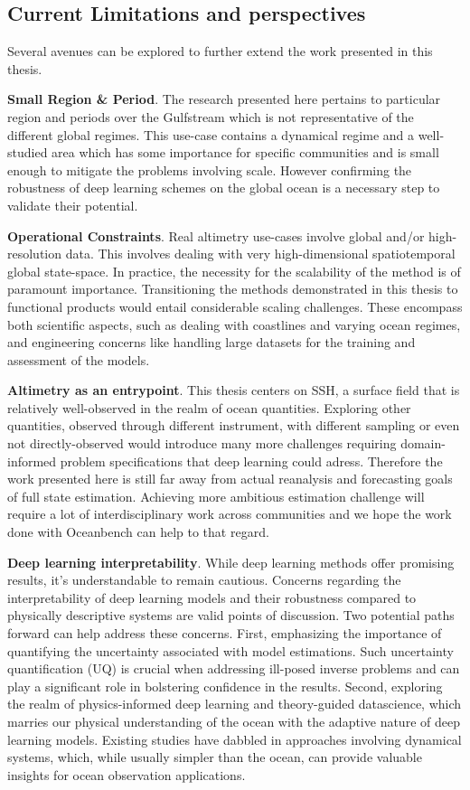 \begin{bibunit}
\newpage
\subsection{Current Limitations and perspectives}

Several avenues can be explored to further extend the work presented in this thesis.

\textbf{Small Region \& Period}.
The research presented here pertains to particular region and periods over the Gulfstream which is not representative of the different global regimes. 
This use-case contains a dynamical regime and a well-studied area which has some importance for specific communities and is small enough to mitigate the problems involving scale. 
However confirming the robustness of deep learning schemes on the global ocean is a necessary step to validate their potential.


\textbf{Operational Constraints}.
Real altimetry use-cases involve global and/or high-resolution data. 
This involves dealing with very high-dimensional spatiotemporal global state-space.
In practice, the necessity for the scalability of the method is of paramount importance.
 Transitioning the methods demonstrated in this thesis to functional products would entail considerable scaling challenges. These encompass both scientific aspects, such as dealing with coastlines and varying ocean regimes, and engineering concerns like handling large datasets for the training and assessment of the models.

\textbf{Altimetry as an entrypoint}.
This thesis centers on SSH, a surface field that is relatively well-observed in the realm of ocean quantities. Exploring other quantities, observed through different instrument, with different sampling or even not directly-observed would introduce many more challenges requiring domain-informed problem specifications that deep learning could adress.
Therefore the work presented here is still far away from actual reanalysis and forecasting goals of full state estimation. 
Achieving more ambitious estimation challenge will require a lot of interdisciplinary work across communities and we hope the work done with Oceanbench can help to that regard. 

\textbf{Deep learning interpretability}.
While deep learning methods offer promising results, it's understandable to remain cautious. Concerns regarding the interpretability of deep learning models and their robustness compared to physically descriptive systems are valid points of discussion.
Two potential paths forward can help address these concerns. First, emphasizing the importance of quantifying the uncertainty associated with model estimations. Such uncertainty quantification (UQ) is crucial when addressing ill-posed inverse problems and can play a significant role in bolstering confidence in the results. Second, exploring the realm of physics-informed deep learning and theory-guided datascience, which marries our physical understanding of the ocean with the adaptive nature of deep learning models. Existing studies have dabbled in approaches involving dynamical systems, which, while usually simpler than the ocean, can provide valuable insights for ocean observation applications.


\end{bibunit}

